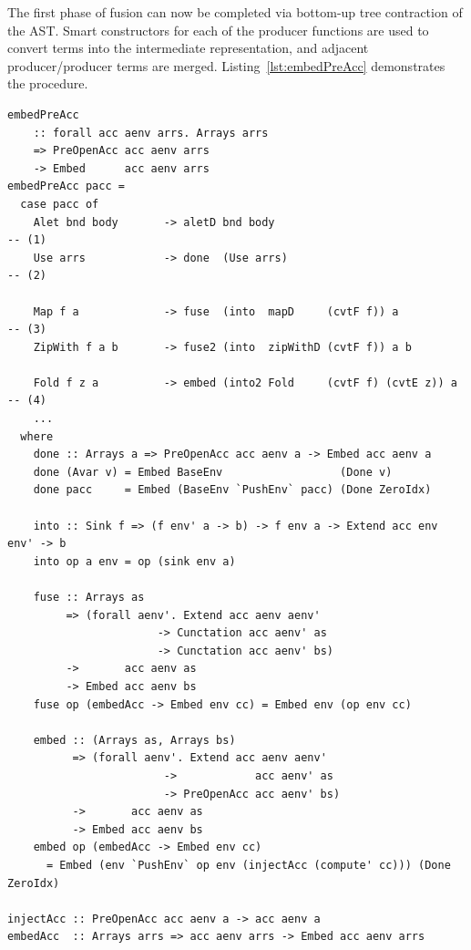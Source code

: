 The first phase of fusion can now be completed via bottom-up tree contraction of
the AST. Smart constructors for each of the producer
functions are used to convert terms into the intermediate representation, and
adjacent producer/producer terms are merged. Listing~\ref{lst:embedPreAcc}
demonstrates the procedure.
%
\begin{lstlisting}[style=haskell_float
    ,label=lst:embedPreAcc
    ,caption={Producer fusion via bottom-up contraction of the AST}]
embedPreAcc
    :: forall acc aenv arrs. Arrays arrs
    => PreOpenAcc acc aenv arrs
    -> Embed      acc aenv arrs
embedPreAcc pacc =
  case pacc of
    Alet bnd body       -> aletD bnd body                                              -- (1)
    Use arrs            -> done  (Use arrs)                                            -- (2)

    Map f a             -> fuse  (into  mapD     (cvtF f)) a                           -- (3)
    ZipWith f a b       -> fuse2 (into  zipWithD (cvtF f)) a b

    Fold f z a          -> embed (into2 Fold     (cvtF f) (cvtE z)) a                  -- (4)
    ...
  where
    done :: Arrays a => PreOpenAcc acc aenv a -> Embed acc aenv a
    done (Avar v) = Embed BaseEnv                  (Done v)
    done pacc     = Embed (BaseEnv `PushEnv` pacc) (Done ZeroIdx)

    into :: Sink f => (f env' a -> b) -> f env a -> Extend acc env env' -> b
    into op a env = op (sink env a)

    fuse :: Arrays as
         => (forall aenv'. Extend acc aenv aenv'
                       -> Cunctation acc aenv' as
                       -> Cunctation acc aenv' bs)
         ->       acc aenv as
         -> Embed acc aenv bs
    fuse op (embedAcc -> Embed env cc) = Embed env (op env cc)

    embed :: (Arrays as, Arrays bs)
          => (forall aenv'. Extend acc aenv aenv'
                        ->            acc aenv' as
                        -> PreOpenAcc acc aenv' bs)
          ->       acc aenv as
          -> Embed acc aenv bs
    embed op (embedAcc -> Embed env cc)
      = Embed (env `PushEnv` op env (injectAcc (compute' cc))) (Done ZeroIdx)

injectAcc :: PreOpenAcc acc aenv a -> acc aenv a
embedAcc  :: Arrays arrs => acc aenv arrs -> Embed acc aenv arrs
\end{lstlisting}

